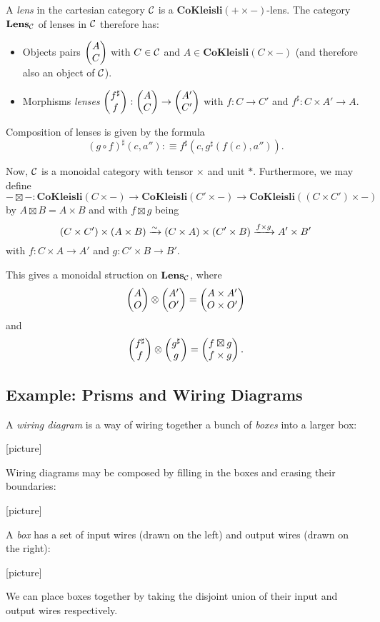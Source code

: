 \begin{defn}
A \emph{lens} in the cartesian category $\operatorname{\mathcal{C}}$ is a $\textbf{CoKleisli}(+ \times
-)$-lens. The category $\textbf{Lens}_{\operatorname{\mathcal{C}}}$ of lenses in $\operatorname{\mathcal{C}}$ therefore has:
\begin{itemize}
\item Objects pairs $\begin{pmatrix}{A} \\ {C} \end{pmatrix}$ with $C \in \operatorname{\mathcal{C}}$ and $A \in
  \textbf{CoKleisli}(C \times -)$ (and therefore also an object of $\operatorname{\mathcal{C}}$).
\item Morphisms \emph{lenses} $\begin{pmatrix}{f^{\sharp}} \\ {f} \end{pmatrix} : \begin{pmatrix}{A} \\ {C} \end{pmatrix} \to
  \begin{pmatrix}{A'} \\ {C'} \end{pmatrix}$ with $f : C \to C'$ and $f^{\sharp} : C \times A' \to
  A$.
\end{itemize}

Composition of lenses is given by the formula
$$(g \circ f)^{\sharp}(c, a'') :\equiv f^{\sharp}(c, g^{\sharp}(f(c), a'')).$$
\end{defn}

Now, $\operatorname{\mathcal{C}}$ is a monoidal category with tensor $\times$ and
unit $\ast$. Furthermore, we may define
$$- \boxtimes - : \textbf{CoKleisli}(C \times -) \to \textbf{CoKleisli}(C'
\times -) \to \textbf{CoKleisli}((C \times C') \times -)$$
by $A \boxtimes B = A \times B$ and with $f \boxtimes g$ being
$$(C \times C') \times (A \times B) \xrightarrow{\sim} (C \times A) \times (C' \times B)
\xrightarrow{f \times g} A' \times B'$$
with $f : C \times A \to A'$ and $g : C' \times B \to B'$.

This gives a monoidal struction on $\textbf{Lens}_{\operatorname{\mathcal{C}}}$, where
$$\begin{pmatrix}{A} \\ {O} \end{pmatrix} \otimes \begin{pmatrix}{A'} \\ {O'} \end{pmatrix} = \begin{pmatrix}{A \times A'} \\ {O \times O'} \end{pmatrix}$$
and
$$\begin{pmatrix}{f^{\sharp}} \\ {f} \end{pmatrix} \otimes \begin{pmatrix}{g^{\sharp}} \\ {g} \end{pmatrix} = \begin{pmatrix}{f \boxtimes g} \\ {f \times g} \end{pmatrix}.$$

\subsection{Example: Prisms and Wiring Diagrams}

A \emph{wiring diagram} is a way of wiring together a bunch of \emph{boxes} into
a larger box:

[picture]

Wiring diagrams may be composed by filling in the boxes and erasing their
boundaries:

[picture]

A \emph{box} has a set of input wires (drawn on the left) and output wires
(drawn on the right):

[picture]

We can place boxes together by taking the disjoint union of their input and
output wires respectively.

